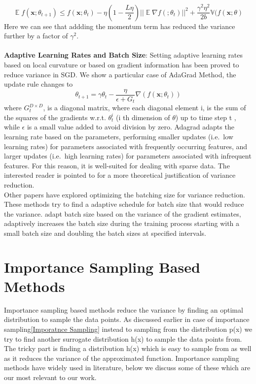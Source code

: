 \documentclass[a4paper,twoside]{iiththesis}
\theoremstyle{definition}
\theoremstyle{definition}
\theoremstyle{remark}
\DeclareMathOperator*{\E}{\mathop{\mathbb{E}}}
\begin{document}
\begin{equation}
\E f(\textbf{x}; \theta_{t+1}) \leq  f(\textbf{x}; \theta_t) - \eta(1 -\frac{L\eta}{2}) ||\E \nabla f(; \theta_{t})||^2 + \frac{\gamma^2 \eta^2}{2 b}  \mathbb{V}(f(\textbf{x} ;\theta) 
\end{equation}
Here we can see that addding the momentum term has reduced the variance further by a factor of $\gamma^2$.
\\
\\
\textbf{Adaptive Learning Rates and Batch Size}: Setting adaptive learning rates based on local curvature\cite{schaul2013no} or based on gradient information \cite{zeiler2012adadelta} has been proved to reduce variance in SGD. We show a particular case of AdaGrad Method, the update rule changes to 
\begin{equation}
	\theta_{t+1} = \gamma \theta_{t} - \frac{\eta} {\epsilon + G_t} \nabla(f(\textbf{x}; \theta_t)) 
\end{equation}
where $G_{t}^{D\times D}$,  is a diagonal matrix, where each diagonal element i, is the sum of the squares of the gradients w.r.t. $\theta^i_t$ (i th dimension of $\theta$) up to time step t , while $\epsilon$ is a small value added to avoid division by zero. Adagrad adapts the learning rate based on the parameters, performing smaller updates 
(i.e.\ low learning rates) for parameters associated with frequently occurring features, and larger updates (i.e.\ high learning rates) for parameters associated with infrequent features. For this reason, it is well-suited for dealing with sparse data. The interested reader is pointed to \cite{schaul2013no} for a more theoretical justification of variance reduction.
\\
Other papers have explored optimizing the batching size for variance reduction. These methods try to find a adaptive schedule for batch size that would reduce the variance. \cite{balles2016coupling} adapt batch size based on the variance of the gradient estimates, \cite{devarakonda2017adabatch} adaptively increases the batch size during the training process starting with a small batch size and doubling the batch sizes at specified intervals.\\

\chapter{Importance Sampling Based Methods}
Importance sampling based methods reduce the variance by finding an optimal distribution to sample the data points. As discussed earlier in case of importance sampling\ref{Imporatnce Sampling} instead to sampling from the distribution p(x) we try to find another surrogate distribution h(x) to sample the data points from. The tricky part is finding a distribution h(x) which is easy to sample from as well as it reduces the variance of the approximated function. Importance sampling methods have widely used in literature, below we discuss some of these which are our most relevant to our work.
\\
\end{document}

